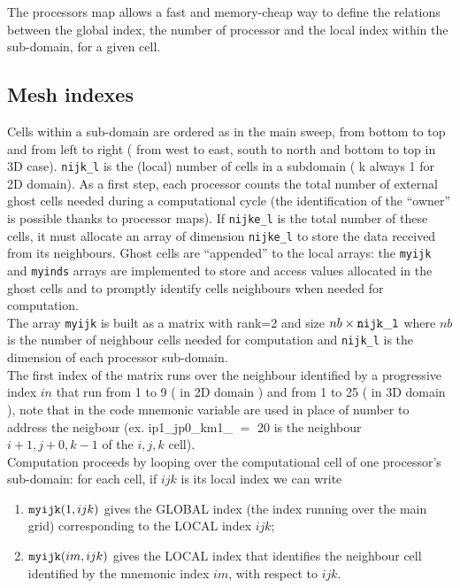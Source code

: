 The processors map allows a fast and memory-cheap way to define the relations
between the global index, the number of processor and the local index 
within the sub-domain, for a given cell.\\
%
\subsection{Mesh indexes}
Cells within a sub-domain are ordered as in the main sweep, from bottom to top and
from left to right ( from west to east, south to north and bottom to top in 3D case). 
{\tt nijk\_l} is the (local) number of cells in a subdomain ( k always 1 for 2D domain).
As a first step, each processor counts the total number of external ghost cells
needed during a computational cycle (the identification of the ``owner'' is 
possible thanks to processor maps). If {\tt nijke\_l} is the total number of these 
cells, it must allocate an array of dimension {\tt nijke\_l} to store the data received
from its neighbours. Ghost cells are ``appended'' to the local arrays:
the {\tt myijk} and {\tt myinds} arrays are implemented
 to store and access values allocated in the ghost cells and to promptly
identify cells neighbours when needed for computation.\\
The array {\tt myijk} is built as a matrix with rank=2 and size 
$nb \times {\tt nijk\_l}$ where $nb$ is the number of neighbour cells 
needed for computation and {\tt nijk\_l} is the dimension of each processor
sub-domain.\\
The first index of the matrix runs over the neighbour identified by a progressive
index $in$ that run from 1 to 9 ( in 2D domain ) and from 1 to 25 ( in 3D domain ),
note that in the code mnemonic variable are used in place of number to address
the neigbour (ex. ip1\_jp0\_km1\_ $=$ 20 is the neighbour $i+1,j+0,k-1$ of the $i,j,k$
cell).\\ 
Computation proceeds by looping  over the computational
cell of one processor's sub-domain: for each cell, if $ijk$ is its local index
we can write
\begin{enumerate}
\item ${\tt myijk}( 1,ijk)$ gives the GLOBAL index (the index running 
      over the main grid) corresponding to the LOCAL index $ijk$;
\item ${\tt myijk}( im,ijk)$ gives the LOCAL index that identifies the neighbour
      cell identified by the mnemonic index $im$, with respect to $ijk$. 
\end{enumerate}

